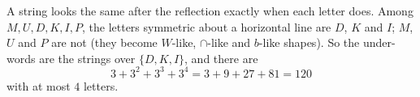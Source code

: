 A string looks the same after the reflection exactly when each letter does. Among $M,U,D,K,I,P$, the letters symmetric about a horizontal line are $D$, $K$ and $I$; $M$, $U$ and $P$ are not (they become $W$-like, $\cap$-like and $b$-like shapes). So the under-words are the strings over $\{D,K,I\}$, and there are
\[
3+3^2+3^3+3^4=3+9+27+81=\boxed{120}
\]
with at most $4$ letters.

